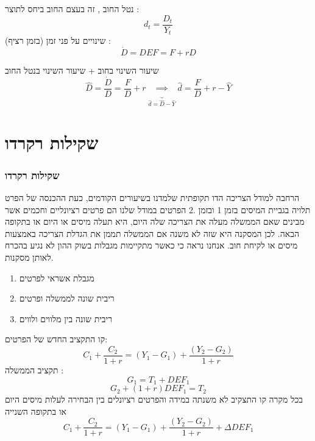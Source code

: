 \documentclass[usenames,dvipsnames]{beamer}
\begin{document}
\begin{RTL}
\begin{frame}[allowframebreaks]
    נטל החוב , זה בעצם החוב ביחס לתוצר :
    \[d_t = \frac{D_t}{Y_t}\]
    שינויים על פני זמן (בזמן רציף) : 
    \[\dot D = DEF  = F + rD\]
    \begin{block}{שיעור השינוי בחוב + שיעור השינוי בנטל החוב }
    \[\hat D = \frac{\dot D }{D } = \frac{F}{D} + r  \underbrace{\implies}_{\hat d = \hat D - \hat Y} \hat d  = \frac{F}{D} + r - \hat Y\]
        
    \end{block}
\end{frame}
\section{שקילות רקרדו}
\begin{frame}[allowframebreaks]
    \frametitle{שקילות רקרדו}
    הרחבה למודל הצריכה הדו תקופתית שלמדנו בשיעורים הקודמים, כעת ההכנסה של הפרט תלויה
בגביית המיסים בזמן 1 ובזמן .2 הפרטים במודל שלנו הם פרטים רציונליים וחכמים אשר מבינים
שאם הממשלה מעלה את הצריכה שלה היום, היא תעלה מיסים או היום או בתקופה הבאה. לכן
המסקנה היא שזה לא משנה אם הממשלה תממן את הגדלת הצריכה באמצעות מיסים או לקיחת
חוב. אנחנו נראה כי כאשר מתקיימות מגבלות בשוק ההון לא נגיע בהכרח לאותן מסקנות.
    
\framebreak
\begin{enumerate}
    \item מגבלת אשראי לפרטים
    \item ריבית שונה לממשלה ופרטים
    \item ריבית שונה בין מלווים ולווים
\end{enumerate}
\framebreak
קו התקציב החדש של הפרטים:
\[C_1 + \frac{C_2}{1+r} = (Y_1 - G_1) +\frac{(Y_2 - G_2)}{1+r} \]
תקציב הממשלה :
\[G_1 = T_1 + DEF_1\]
\[G_2  +(1+r)DEF_1 = T_2\]
בכל מקרה קו התצקיב לא משנתה במידה והפרטים רציונלים בין הבחירה לעלות מיסים היום או בתקופה השנייה
\[C_1 + \frac{C_2}{1+r} = (Y_1 - G_1) +\frac{(Y_2 - G_2)}{1+r} + \Delta DEF_1 \]
\end{frame}
\end{RTL}
\end{document}
